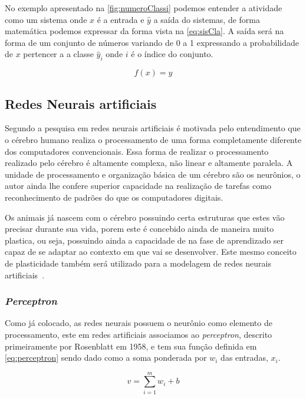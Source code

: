 \documentclass[
    12pt,
    oneside,
    a4paper,
    english,
    brazil
]{abntex2}
\begin{document}
No exemplo apresentado na \autoref{fig:numeroClassi} podemos entender a
atividade como um sistema onde $x$ é a entrada e $\hat{y}$ a saída do sistemas,
de forma matemática podemos expressar da forma vista na \autoref{eq:sisCla}. A
saída será na forma de um conjunto de números variando de 0 a 1 expressando a
probabilidade de $x$ pertencer a a classe $\hat{y}_i$ onde $i$ é o índice do
conjunto.

\begin{equation}
    \label{eq:sisCla}
    f(x) = \hat{y}
\end{equation}

\subsection{Redes Neurais artificiais}

Segundo  a pesquisa em redes neurais artificiais é motivada
pelo entendimento que o cérebro humano realiza o processamento de uma forma
completamente diferente dos computadores convencionais. Essa forma de realizar
o processamento realizado pelo cérebro é altamente complexa, não linear e
altamente paralela. A unidade de processamento e organização básica de um
cérebro são os neurônios, o autor ainda lhe confere superior capacidade na
realização de tarefas como reconhecimento de padrões do que os computadores
digitais.

Os animais já nascem com o cérebro possuindo certa estruturas que estes vão
precisar durante sua vida, porem este é concebido ainda de maneira muito
plastica, ou seja, possuindo ainda a capacidade de na fase de aprendizado ser
capaz de se adaptar ao contexto em que vai se desenvolver. Este mesmo conceito
de plasticidade também será utilizado para a modelagem de redes neurais
artificiais~\cite{haykin}.

\subsubsection{\textit{Perceptron}}

Como já colocado, as redes neurais possuem o neurônio como elemento de
processamento, este em redes artificiais associamos ao \textit{perceptron},
descrito primeiramente por Rosenblatt em 1958, e tem sua função definida em
\autoref{eq:perceptron} sendo dado como a soma ponderada por $w_i$ das
entradas, $x_i$.

\begin{equation}
    \label{eq:perceptron}
    v = \sum_{i=1}^{m}{w_i + b}
\end{equation}
\end{document}
